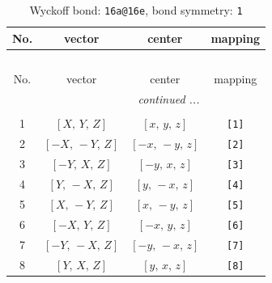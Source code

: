 \documentclass[fleqn,8pt]{jsarticle}
\begin{document}
\begin{longtable}{cccc}
\caption{Wyckoff bond: {\tt 16a@16e}, bond symmetry: {\tt 1}}
 \\
 \hline \hline
No. & vector & center & mapping \\ \hline \endfirsthead

\multicolumn{3}{l}{\tablename\ \thetable{}} \\
 \hline \hline
No. & vector & center & mapping \\ \hline \endhead

 \hline \hline
\multicolumn{3}{r}{\footnotesize\it continued ...} \\ \endfoot

 \hline \hline
\multicolumn{3}{r}{} \\ \endlastfoot

1 & $\left[ X,\, Y,\, Z \right]$ & $\left[ x,\, y,\, z \right]$ & {\tt [1]} \\ \hline
2 & $\left[ - X,\, - Y,\, Z \right]$ & $\left[ - x,\, - y,\, z \right]$ & {\tt [2]} \\ \hline
3 & $\left[ - Y,\, X,\, Z \right]$ & $\left[ - y,\, x,\, z \right]$ & {\tt [3]} \\ \hline
4 & $\left[ Y,\, - X,\, Z \right]$ & $\left[ y,\, - x,\, z \right]$ & {\tt [4]} \\ \hline
5 & $\left[ X,\, - Y,\, Z \right]$ & $\left[ x,\, - y,\, z \right]$ & {\tt [5]} \\ \hline
6 & $\left[ - X,\, Y,\, Z \right]$ & $\left[ - x,\, y,\, z \right]$ & {\tt [6]} \\ \hline
7 & $\left[ - Y,\, - X,\, Z \right]$ & $\left[ - y,\, - x,\, z \right]$ & {\tt [7]} \\ \hline
8 & $\left[ Y,\, X,\, Z \right]$ & $\left[ y,\, x,\, z \right]$ & {\tt [8]} \\
\end{longtable}
\end{document}
